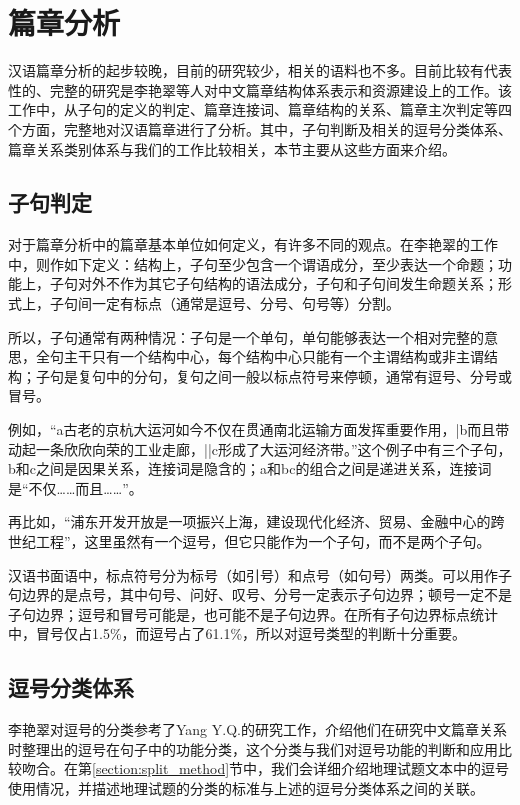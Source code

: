 \documentclass[master, winfont]{njuthesis}
\begin{document}
\section{篇章分析}
汉语篇章分析的起步较晚，目前的研究较少，相关的语料也不多。目前比较有代表性的、完整的研究是李艳翠等人\cite{liyancui2015}对中文篇章结构体系表示和资源建设上的工作。该工作中，从子句的定义的判定、篇章连接词、篇章结构的关系、篇章主次判定等四个方面，完整地对汉语篇章进行了分析。其中，子句判断及相关的逗号分类体系、篇章关系类别体系与我们的工作比较相关，本节主要从这些方面来介绍。

\subsection{子句判定}
对于篇章分析中的篇章基本单位如何定义，有许多不同的观点。在李艳翠的工作中，则作如下定义：结构上，子句至少包含一个谓语成分，至少表达一个命题；功能上，子句对外不作为其它子句结构的语法成分，子句和子句间发生命题关系；形式上，子句间一定有标点（通常是逗号、分号、句号等）分割。

所以，子句通常有两种情况：子句是一个单句，单句能够表达一个相对完整的意思，全句主干只有一个结构中心，每个结构中心只能有一个主谓结构或非主谓结构；子句是复句中的分句，复句之间一般以标点符号来停顿，通常有逗号、分号或冒号。

例如，“a古老的京杭大运河如今不仅在贯通南北运输方面发挥重要作用，|b而且带动起一条欣欣向荣的工业走廊，||c形成了大运河经济带。”这个例子中有三个子句，b和c之间是因果关系，连接词是隐含的；a和bc的组合之间是递进关系，连接词是“不仅……而且……”。

再比如，“浦东开发开放是一项振兴上海，建设现代化经济、贸易、金融中心的跨世纪工程”，这里虽然有一个逗号，但它只能作为一个子句，而不是两个子句。

汉语书面语中，标点符号分为标号（如引号）和点号（如句号）两类。可以用作子句边界的是点号，其中句号、问好、叹号、分号一定表示子句边界；顿号一定不是子句边界；逗号和冒号可能是，也可能不是子句边界。在所有子句边界标点统计中，冒号仅占1.5\%，而逗号占了61.1\%，所以对逗号类型的判断十分重要。

\subsection{逗号分类体系}
\label{commaclssify}
李艳翠对逗号的分类参考了Yang Y.Q.\cite{Yang2012Chinese}的研究工作，介绍他们在研究中文篇章关系时整理出的逗号在句子中的功能分类，这个分类与我们对逗号功能的判断和应用比较吻合。在第\ref{section:split_method}节中，我们会详细介绍地理试题文本中的逗号使用情况，并描述地理试题的分类的标准与上述的逗号分类体系之间的关联。
\end{document}
